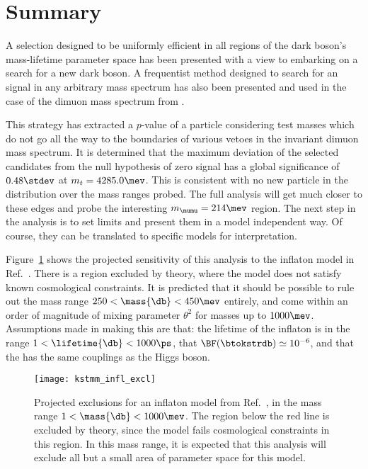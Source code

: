 \section{Summary}

A selection designed to be uniformly efficient in all regions of the dark boson's mass-lifetime
parameter space has been presented with a view to embarking on a search for a new dark boson.
A frequentist method designed to search for an signal in any arbitrary mass spectrum has also been
presented and used in the case of the dimuon mass spectrum from \btokstrmumu.

This strategy has extracted a $p$-value of a particle considering test masses which do not go all
the way to the boundaries of various vetoes in the invariant dimuon mass spectrum.
It is determined that the maximum deviation of the selected candidates from the null hypothesis of
zero signal has a global significance of $0.48\stdev$ at $m_t = 4285.0\mev$.
This is consistent with no new particle in the \mumu distribution over the mass ranges probed.
The full analysis will get much closer to these edges and probe the interesting $m_{\mumu}=214\mev$
region.
The next step in the analysis is to set limits and present them in a model independent way.
Of course, they can be translated to specific models for interpretation.


Figure~\ref{fig:db:excl:infl} shows the projected
sensitivity of this analysis to the inflaton model in Ref.~\cite{Bezrukov:2014nza}.
There is a region excluded by theory, where the model does not satisfy known cosmological
constraints.
It is predicted that it should be possible to rule out the mass range
$250<\mass{\db}<450\mev$ entirely, and come within an order of magnitude of mixing parameter
$\theta^2$ for masses up to $1000\mev$.
Assumptions made in making this are that: the lifetime of the inflaton is in the range
$1<\lifetime{\db}<1000\ps$, that $\BF(\btokstrdb)\simeq10^{-6}$,
and that the \db has the same couplings as the Higgs boson.

\begin{figure}
  \begin{center}
    \texttt{[image: kstmm\_infl\_excl]}
    \caption[Projected sensitivity in an inflaton search]
    {
      Projected exclusions for an inflaton model from Ref.~\protect\cite{Bezrukov:2014nza}, in the
      mass range $1<\mass{\db}<1000\mev$.
      The region below the red line is excluded by theory, since the model fails cosmological
      constraints in this region.
      In this mass range, it is expected that this analysis will exclude all but a small area of
      parameter space for this model.
    }
    \label{fig:db:excl:infl}
  \end{center}
\end{figure}







